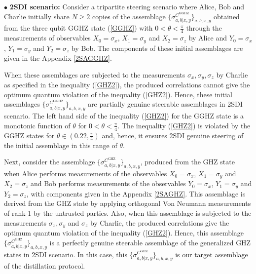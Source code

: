 \documentclass[reprint,superscriptaddress,nofootinbib,amsmath,amssymb,aps,pra,longbibliography]{revtex4-1}
\begin{document}
\vspace{1cm}
$\bullet$ {\bf 2SDI scenario:}  Consider a tripartite steering scenario where Alice, Bob and Charlie  initially share $N \geq 2$ copies of the assemblage $\{\sigma_{a,b|x,y}^{C^{\text{GGHZ}}}\}_{a,b,x,y}$ obtained from the three qubit GGHZ state (\ref{GGHZ}) with $0 < \theta < \frac{\pi}{4}$ through the measurements of observables $X_0= \sigma_x$, $X_1= \sigma_y$ and $X_2=\sigma_z$ by Alice and $Y_0= \sigma_x$, $Y_1= \sigma_y$ and $Y_2=\sigma_z$ by Bob. The components of these initial assemblages are given in the Appendix \ref{2SAGGHZ}.

When these assemblages are subjected to the measurements $ \sigma_x,  \sigma_y,  \sigma_z$ by Charlie as specified in the inequality (\ref{GHZ2}), the produced correlations cannot give the optimum quantum violation of the inequality (\ref{GHZ2}). Hence,   these initial assemblages $\{\sigma_{a,b|x,y}^{C^{\text{GGHZ}}}\}_{a,b,x,y}$ are partially genuine steerable assemblages in 2SDI scenario. The left hand side of the inequality (\ref{GHZ2}) for the GGHZ state is a monotonic function of $\theta$ for  $0 < \theta < \frac{\pi}{4}$.  The inequality (\ref{GHZ2}) is violated  by the GGHZ states for $\theta \in ( 0.22, \frac{\pi}{4})$ and, hence, it ensures 2SDI genuine steering of the initial assemblage in this range of $\theta$. 

Next, consider the assemblage $\{ \sigma_{a,b|x,y}^{C^{\text{GHZ}}} \}_{a,b,x,y}$, produced from the GHZ state when Alice performs measurements of the observables $X_0= \sigma_x$, $X_1= \sigma_y$ and $X_2=\sigma_z$ and Bob performs measurements of the observables $Y_0= \sigma_x$, $Y_1= \sigma_y$ and $Y_2=\sigma_z$, with components given in the Appendix \ref{2SAGHZ}.  This assemblage is derived from the GHZ state by applying orthogonal Von Neumann measurements of rank-1 by the untrusted parties. Also, when this assemblage is subjected to the measurements $ \sigma_x, \sigma_y$ and $ \sigma_z$ by Charlie, the produced correlations give the optimum quantum violation of the inequality (\ref{GHZ2}). Hence,  this assemblage $\{ \sigma_{a,b|x,y}^{C^{\text{GHZ}}} \}_{a,b,x,y}$ is a perfectly genuine steerable assemblage of the generalized GHZ states in 2SDI scenario. In this case, this $\{ \sigma_{a,b|x,y}^{C^{\text{GHZ}}} \}_{a,b,x,y}$  is our target assemblage of the distillation protocol.
\end{document}
